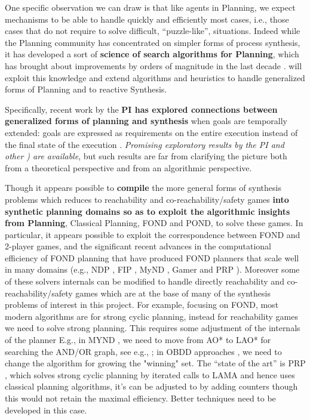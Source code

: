 One specific observation we can draw is that like agents in Planning,
we expect mechanisms to be able to handle quickly and efficiently most
cases, i.e., those cases that do not require to solve difficult,
``puzzle-like'', situations. Indeed while the Planning community has
concentrated on simpler forms of process synthesis, it has developed a
sort of \textbf{science of search algorithms for Planning}, which has
brought about improvements by orders of magnitude in the last decade
\cite{PommereningHB17,SteinmetzH17,LipovetzkyG17,DeGMMP17}. \project
will exploit this knowledge and extend algorithms and heuristics to
handle generalized forms of Planning and to reactive Synthesis.

Specifically, recent work by the \textbf{PI has explored connections between generalized forms of planning and synthesis} when goals are temporally extended: goals are expressed as requirements on the entire execution instead of the final state of the execution \cite{KabanzaBS97,BacchusK98,CerritoM98,DeGiacomoV99,BacchusK00,CalvaneseGV02}. 
\emph{Promising exploratory results by the PI and other \cite{DeGiacomoFPS10,SardinaD15,DeVa13,DeVa15,CamachoTMBM17}) are available}, but such results are far from clarifying the picture both from a theoretical perspective and from an algorithmic perspective.

Though it appears possible to \textbf{compile} the more general forms of synthesis problems which reduces to reachability and co-reachability/safety games \textbf{into synthetic planning domains so as to exploit the algorithmic insights from Planning}, Classical Planning, FOND and POND, to solve these games. 
In particular,  it appears possible to exploit the correspondence between FOND and 2-player games, and  the significant recent advances in the computational efficiency of FOND planning that have produced FOND planners that scale well in many domains (e.g., NDP \cite{AlfordKNG14}, FIP \cite{FuNBY11,FuJNBY16}, MyND \cite{DMattmullerOHB10}, Gamer \cite{KissmannE11} and PRP \cite{MuiseMB12}). 
Moreover some of these solvers internals can be modified to handle directly reachability and co-reachability/safety games which are at the base of many of the synthesis problems of interest in this project.  
For example, focusing on FOND, most modern algorithms are for strong cyclic planning, instead for reachability games we need to solve strong planning.
This requires some adjustment of the internals of the planner
E.g., in MYND \cite{DMattmullerOHB10}, we need  to move from AO* to LAO* for searching the AND/OR graph, see e.g., ;
in OBDD approaches \cite{TorralbaAKE17}, we need to change the algorithm for growing the "winning" set.
The ``state of the art'' is PRP \cite{MuiseMB12}, which solves strong cyclic planning by  iterated calls to LAMA \cite{RichterW10} and hence uses classical planning algorithms, it's can be adjusted to by adding counters though this would not retain the maximal efficiency. Better techniques need to be developed in this case.

